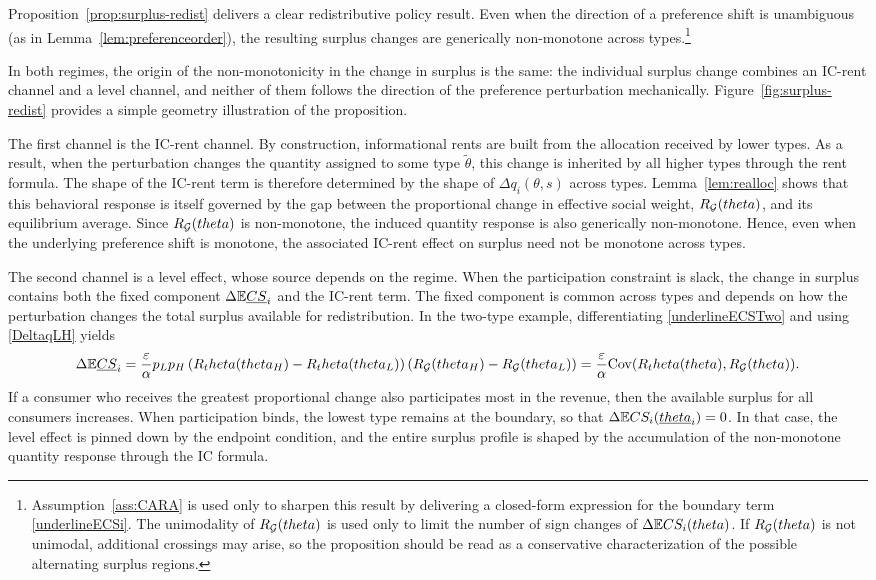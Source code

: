 \documentclass{class}
\begin{document}
Proposition~\ref{prop:surplus-redist} delivers a clear redistributive policy result. Even when the direction of a preference shift is unambiguous (as in Lemma~\ref{lem:preferenceorder}), the resulting surplus changes are generically non-monotone across types.\footnote{Assumption~\ref{ass:CARA} is used only to sharpen this result by delivering a closed-form expression for the boundary term \ref{underlineECSi}. The unimodality of \(R_{\mathcal{G}}(theta)\) is used only to limit the number of sign changes of \(\Delta \mathbb{E} CS_i(theta)\). If \(R_{\mathcal{G}}(theta)\) is not unimodal, additional crossings may arise, so the proposition should be read as a conservative characterization of the possible alternating surplus regions.}

In both regimes, the origin of the non-monotonicity in the change in surplus is the same: the individual surplus change combines an IC-rent channel and a level channel, and neither of them follows the direction of the preference perturbation mechanically. Figure~\ref{fig:surplus-redist} provides a simple geometry illustration of the proposition.

The first channel is the IC-rent channel. By construction, informational rents are built from the allocation received by lower types. As a result, when the perturbation changes the quantity assigned to some type \(\tilde\theta\), this change is inherited by all higher types through the rent formula. The shape of the IC-rent term is therefore determined by the shape of \(\Delta q_i(\theta,s)\) across types. Lemma~\ref{lem:realloc} shows that this behavioral response is itself governed by the gap between the proportional change in effective social weight, \(R_{\mathcal{G}}(theta)\), and its equilibrium average. Since \(R_{\mathcal{G}}(theta)\) is non-monotone, the induced quantity response is also generically non-monotone. Hence, even when the underlying preference shift is monotone, the associated IC-rent effect on surplus need not be monotone across types.

The second channel is a level effect, whose source depends on the regime. When the participation constraint is slack, the change in surplus contains both the fixed component $\Delta \mathbb{E} \underline{CS}_i$ and the IC-rent term. The fixed component is common across types and depends on how the perturbation changes the total surplus available for redistribution. In the two-type example, differentiating \ref{underlineECSTwo} and using \ref{DeltaqLH} yields
\[
\Delta\mathbb{E}\underline{CS}_i
=
\frac{\varepsilon}{\alpha}p_Lp_H
\left(R_theta(theta_H)-R_theta(theta_L)\right)
\left(R_{\mathcal{G}}(theta_H)-R_{\mathcal{G}}(theta_L)\right)
=
\frac{\varepsilon}{\alpha}\mathrm{Cov}(R_theta(theta),R_{\mathcal{G}}(theta)).
\]
If a consumer who receives the greatest proportional change also participates most in the revenue, then the available surplus for all consumers increases. When participation binds, the lowest type remains at the boundary, so that \(\Delta \mathbb{E} CS_i(\underline{theta}_i)=0\). In that case, the level effect is pinned down by the endpoint condition, and the entire surplus profile is shaped by the accumulation of the non-monotone quantity response through the IC formula.
\end{document}
